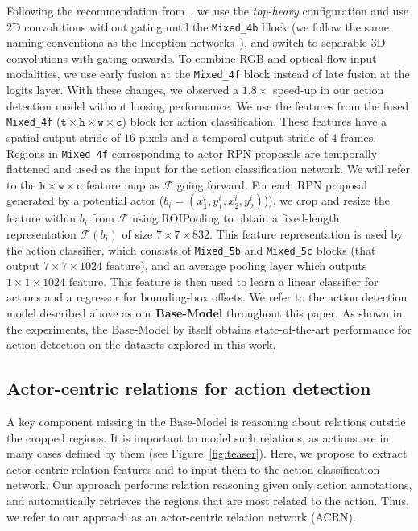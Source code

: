 \documentclass[runningheads]{llncs}
\newcommand{\mixed}[1]{\texttt{Mixed\_#1}}
\begin{document}
Following the recommendation from~\cite{s3dg_2017}, we use the \textit{top-heavy} configuration and use 2D convolutions without gating until the \mixed{4b} block (we follow the same naming conventions as the Inception networks~\cite{inception}), and switch to separable 3D convolutions with gating onwards. To combine RGB and optical flow input modalities, we use early fusion at the \mixed{4f} block instead of late fusion at the logits layer. With these changes, we observed a $1.8\times$ speed-up in our action detection model without loosing performance. We use the features from the fused \mixed{4f} ($\texttt{t}\times\texttt{h}\times\texttt{w}\times\texttt{c}$) block for action classification. These features have a spatial output stride of $16$ pixels and a temporal output stride of $4$ frames. Regions in \mixed{4f} corresponding to actor RPN proposals are temporally flattened and used as the input for the action classification network. We will refer to the $\texttt{h}\times\texttt{w}\times\texttt{c}$ feature map as $\mathcal{F}$ going forward. For each RPN proposal generated by a potential actor ($b_i = (x^i_1, y^i_1, x^i_2, y^i_2)$)), we crop and resize the feature within $b_i$ from $\mathcal{F}$ using ROIPooling to obtain a fixed-length representation $\mathcal{F}\left(b_i\right)$ of size $7\times7\times832$. This feature representation is used by the action classifier, which consists of \mixed{5b} and \mixed{5c} blocks (that output $7\times7\times1024$ feature), and an average pooling layer which outputs $1\times1\times1024$ feature. This feature is then used to learn a linear classifier for actions and a regressor for bounding-box offsets. We refer to the action detection model described above as our \textbf{Base-Model} throughout this paper. As shown in the experiments, the Base-Model by itself obtains state-of-the-art performance for action detection on the datasets explored in this work.


\subsection{Actor-centric relations for action detection}
A key component missing in the Base-Model is reasoning about relations outside the cropped regions. It is important to model such relations, as actions are in many cases defined by them (see Figure~\ref{fig:teaser}). 
Here, we propose to extract actor-centric relation features and to input them to the action classification network. Our approach performs relation reasoning given only action annotations, and  automatically retrieves the regions that are most related to the action. Thus, we refer to our approach as an actor-centric relation network (ACRN).
\end{document}
